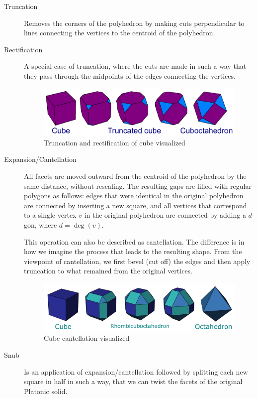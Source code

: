 \begin{description}
    \item[Truncation] Removes the corners of the polyhedron by making cuts perpendicular to lines connecting the vertices to the centroid of the polyhedron.
    \item[Rectification] A special case of truncation, where the cuts are made in such a way that they pass through the midpoints of the edges connecting the vertices.
    \begin{figure}[H]
        \centering
        \includegraphics[width=1\textwidth]{../Resources/Figs/op_truncation.pdf}
        \caption{Truncation and rectification of cube visualized \cite{wikimedia-cube-truncation}}
        \label{fig:op_truncation}
    \end{figure}
    \item[Expansion/Cantellation] All facets are moved outward from the centroid of the polyhedron by the same distance, without rescaling. The resulting gaps are filled with regular polygons as follows: edges that were identical in the original polyhedron are connected by inserting a new square, and all vertices that correspond to a single vertex $v$ in the original polyhedron are connected by adding a $d$-gon, where $d = \deg(v)$.

    This operation can also be described as cantellation. The difference is in how we imagine the process that leads to the resulting shape. From the viewpoint of cantellation, we first bevel (cut off) the edges and then apply truncation to what remained from the original vertices.
    \begin{figure}[H]
        \centering
        \includegraphics[width=1\textwidth]{../Resources/Figs/op_cantellation.pdf}
        \caption{Cube cantellation visualized \cite{wikimedia-cube-cantellation}}
        \label{fig:op_cantellation}
    \end{figure}
    \item[Snub] Is an application of expansion/cantellation followed by splitting each new square in half in such a way, that we can twist the facets of the original Platonic solid.
    


\end{description}
